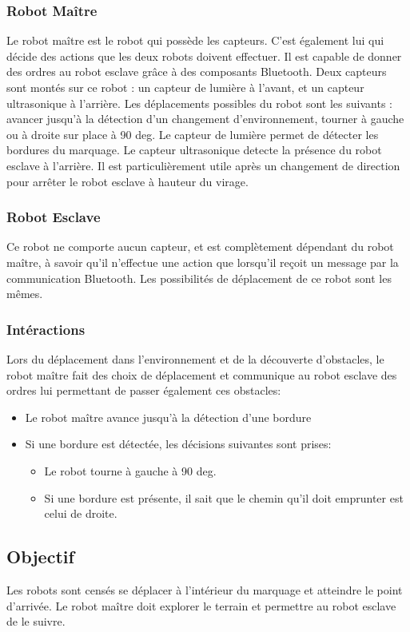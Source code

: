    \subsubsection{Robot Ma\^{i}tre}
   Le robot ma\^{i}tre est le robot qui poss\`{e}de les capteurs. C'est
   \'{e}galement lui qui d\'{e}cide des actions que les deux robots doivent
   effectuer. Il est capable de donner des ordres au robot esclave
   gr\^{a}ce \`{a} des composants Bluetooth. Deux capteurs sont mont\'{e}s sur
   ce robot : un capteur de lumi\`{e}re \`{a} l'avant, et un capteur
   ultrasonique \`{a} l'arri\`{e}re. Les d\'{e}placements possibles du robot sont
   les suivants : avancer jusqu'\`{a} la d\'{e}tection d'un changement
   d'environnement, tourner \`{a} gauche ou \`{a} droite sur place \`{a}
   90 deg. Le
   capteur de lumi\`{e}re permet de d\'{e}tecter les bordures du marquage. Le
   capteur ultrasonique detecte la pr\'{e}sence du robot esclave \`{a}
   l'arri\`{e}re. Il est particuli\`{e}rement utile apr\`{e}s un changement de
   direction pour arr\^{e}ter le robot esclave \`{a} hauteur du virage. 

   \subsubsection{Robot Esclave}
   Ce robot ne comporte aucun capteur, et est compl\`{e}tement d\'{e}pendant du
   robot ma\^{i}tre, \`{a} savoir qu'il n'effectue une action que lorsqu'il
   re\c coit un message par la communication Bluetooth. Les possibilit\'{e}s de
   d\'{e}placement de ce robot sont les m\^{e}mes.

   \subsubsection{Int\'{e}ractions}
   Lors du d\'{e}placement dans l'environnement et de la d\'{e}couverte
   d'obstacles, le robot ma\^{i}tre fait des choix de d\'{e}placement et
   communique au robot esclave des ordres lui permettant de passer
   \'{e}galement ces obstacles:
   \begin{itemize}
    \item Le robot ma\^{i}tre avance jusqu'\`{a} la d\'{e}tection d'une bordure
    \item Si une bordure est d\'{e}tect\'{e}e, les d\'{e}cisions suivantes sont
	  prises:
    \begin{itemize}
     \item Le robot tourne \`{a} gauche \`{a} 90 deg.
     \item Si une bordure est pr\'{e}sente, il sait que le chemin qu'il doit
	   emprunter est celui de droite.
    \end{itemize}
   \end{itemize}

  \subsection{Objectif}
  Les robots sont cens\'{e}s se d\'{e}placer \`{a} l'int\'{e}rieur du marquage et
  atteindre le point d'arriv\'{e}e. Le robot ma\^{i}tre doit explorer le terrain
  et permettre au robot esclave de le suivre. 
